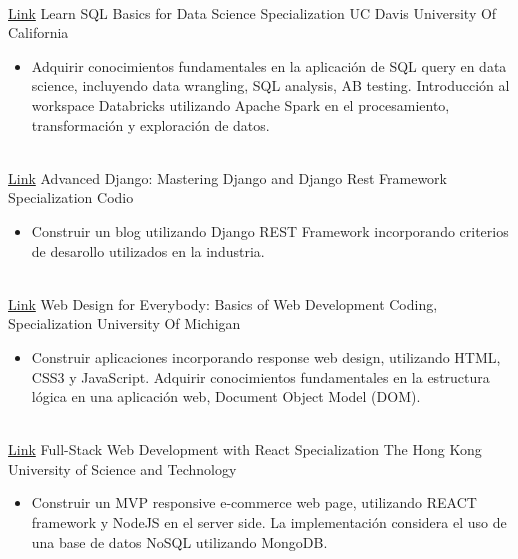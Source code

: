 \documentclass[letterpaper]{DS_class_file} %
\begin{document}
\begin{twenty}
{	}
	\\
	\twentyitem
	{\href{https://www.coursera.org/specializations/learn-sql-basics-data-science}{Link}}
	{}
	{\hspace{0.1cm}Learn SQL Basics for Data Science Specialization}
	{UC Davis University Of California}
	{}
	{
		{\begin{itemize}
				\item Adquirir conocimientos fundamentales en la aplicación de SQL query en data science, incluyendo  data wrangling, SQL analysis, AB testing. Introducción al workspace Databricks utilizando Apache Spark en el procesamiento, transformación y exploración de datos.
		\end{itemize}}
	}
	\\
	\twentyitem
	{\href{https://github.com/maaferna/codio_blango}{Link}}
	{}
	{\hspace{0.3cm}Advanced Django: Mastering Django and Django Rest Framework Specialization}
	{Codio}
	{}
	{
		{\begin{itemize}
				\item Construir un blog utilizando Django REST Framework incorporando criterios de desarollo utilizados en la industria.
		\end{itemize}}
	}
	\\
\twentyitem
{\href{https://www.coursera.org/specializations/web-design}{Link}}
{}
{\hspace{0.3cm}Web Design for Everybody: Basics of Web Development  Coding, Specialization}
{University Of Michigan}
{}
{
	{\begin{itemize}
			\item Construir aplicaciones incorporando response web design, utilizando HTML, CSS3 y JavaScript. Adquirir conocimientos fundamentales en la estructura lógica en una aplicación web, Document Object Model (DOM).
	\end{itemize}}
}
	\\
\twentyitem
{\href{https://github.com/maaferna/react_project}{Link}}
{}
{\hspace{0.3cm}Full-Stack Web Development with React Specialization}
{The Hong Kong University of Science and Technology}
{}
{
	{\begin{itemize}
			\item Construir un MVP responsive e-commerce web page, utilizando REACT framework y NodeJS en el server side. La implementación considera el uso de una base de datos NoSQL utilizando MongoDB.
	\end{itemize}}
}
	\\

\end{twenty}
\end{document}
